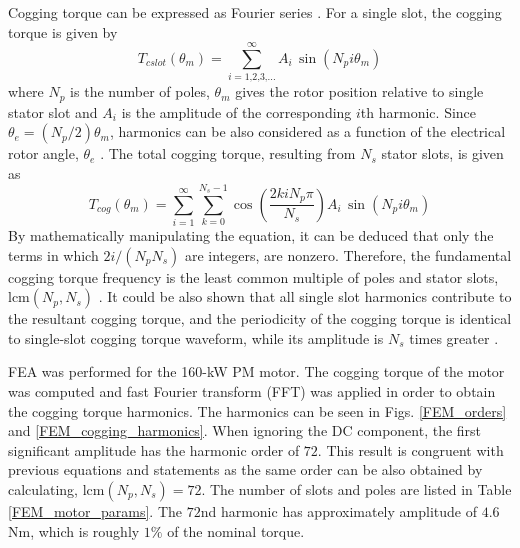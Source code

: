 Cogging torque can be expressed as Fourier series \cite{CTR_HW:2002, CTR_HW:2004, cogging:2006, CTR:2010, CTR_HW:2013, CTR_HW_skew:2013, CTR_SW:2017, CTR_HW:2017}. For a single slot, the cogging torque is given by \cite{cogging:2006, CTR_HW:2013}
\begin{equation}
    T_{cslot}(\theta_m) = \sum_{i=\text{1,2,3,...}}^{\infty} A_i \, \sin(N_pi\theta_m)
    \label{eq_cogging_torque1}
\end{equation}
where $N_p$ is the number of poles, $\theta_m$ gives the rotor position relative to single stator slot and $A_i$ is the amplitude of the corresponding $i$th harmonic. Since $\theta_e = (N_p/2)\theta_m$, harmonics can be also considered as a function of the electrical rotor angle, $\theta_e$ \cite{ILC:2012, ILC:2018}. The total cogging torque, resulting from $N_s$ stator slots, is given as \cite{cogging:2006, CTR_HW:2013}
\begin{equation}
    T_{cog}(\theta_m) = \sum_{i=\text{1}}^{\infty} \sum_{k=\text{0}}^{N_s-1} \cos\left(\frac{2kiN_p\pi}{N_s}\right)A_i \, \sin(N_pi\theta_m)
    \label{eq_cogging_torque2}
\end{equation}
By mathematically manipulating the equation, it can be deduced that only the terms in which $2i/(N_p N_s)$ are integers, are nonzero. Therefore, the fundamental cogging torque frequency is the least common multiple of poles and stator slots, lcm$(N_p, N_s)$ \cite{cogging:2006, CTR_HW:2013, CTR_Analytical:2009}. It could be also shown that all single slot harmonics contribute to the resultant cogging torque, and the periodicity of the cogging torque is identical to single-slot cogging torque waveform, while its amplitude is $N_s$ times greater \cite{cogging:2006}. 

FEA was performed for the 160-kW PM motor. The cogging torque of the motor was computed and fast Fourier transform (FFT) was applied in order to obtain the cogging torque harmonics. The harmonics can be seen in Figs. \ref{FEM_orders} and \ref{FEM_cogging_harmonics}. When ignoring the DC component, the first significant amplitude has the harmonic order of $72$. This result is congruent with previous equations and statements as the same order can be also obtained by calculating, lcm$(N_p, N_s) = 72$. The number of slots and poles are listed in Table \ref{FEM_motor_params}. The $72$nd harmonic has approximately amplitude of $4.6$ Nm, which is roughly $1\%$ of the nominal torque.


